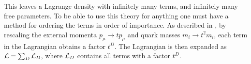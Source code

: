 This leaves a Lagrange density with infinitely many terms, and infinitely many free parameters.
To be able to use this theory for anything one must have a method for ordering the terms in order of importance.
As described in \cite{Scherer2002IntroductionTC}, by rescaling the external momenta $p_\mu \rightarrow t p_\mu$ and quark masses $m_i \rightarrow t^2 m_i$, each term in the Lagrangian obtains a factor $t^D$.
The Lagrangian is then expanded as $\mathcal{L} = \sum_D \mathcal{L}_D$, where $\mathcal{L}_D$ contains all terms with a factor $t^D$.
